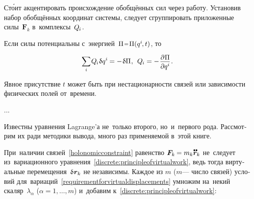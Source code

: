 \begin{otherlanguage}{russian}
\vspace{-0.15em}\noindent
Ст\'{о}ит акцентировать происхождение обобщённых сил через работу.
Установив набор обобщённых координат системы, следует сгруппировать приложенные силы~${\bm{F}_k}$ в~комплексы~${Q_{\hspace{-0.1ex}i}}$.

Если силы потенциальны с~энергией~${\potential \narroweq \potential(q^i \hspace{-0.2ex} , t)}$, то

\nopagebreak\vspace{-0.2em}\begin{equation}
\scalebox{0.92}[0.96]{$\displaystyle \sum_{i}$} \hspace{.16ex} Q_{\hspace{-0.1ex}i} \hspace{.12ex} \variation{q^i} \hspace{-0.1ex}
= - \hspace{.16ex} \variation{\potential} \hspace{.1ex} ,
\:\:
Q_{\hspace{-0.1ex}i} = - \hspace{.16ex} \scalebox{0.96}{$ \displaystyle \frac{\raisemath{-0.12em}{\partial \hspace{.1ex} \potential}}{\raisemath{-0.1em}{\partial q^i}} $} \hspace{.16ex} .
\vspace{-0.1em}\end{equation}

\vspace{-0.15em}\noindent
Явное присутствие $t$ может быть при нестационарности связей или зависимости физических полей от~времени.

...

Известны уравнения Lagrange’а не~только второго, но~и~первого рода.
Рассмотрим их ради методики вывода, много раз применяемой в~этой книге.

При~наличии связей~\eqref{holonomicconstraint} равенство ${\bm{F}_k \hspace{-0.12ex} = m_k \mathdotdotabove{\locationvector}_k}$ не~следует из~вариационного уравнения~\eqref{discrete:principleofvirtualwork}, ведь тогда виртуальные перемещения~${\variation{\hspace{.1ex}\locationvector_k}}$ не независимы.
Каждое из $m$ ($m$\:--- число связей) условий для~вариаций~\eqref{requirementforvirtualdisplacements} умножим на~некий скаляр~$\lambda_{\alpha}$ (${\alpha = 1, \ldots, m}$) и~добавим к~\eqref{discrete:principleofvirtualwork}:


\end{otherlanguage}
